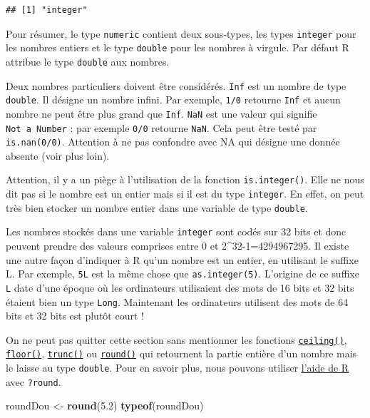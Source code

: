 \documentclass[]{book}
\newenvironment{Shaded}{\begin{snugshade}}{\end{snugshade}}
\newcommand{\FloatTok}[1]{\textcolor[rgb]{0.00,0.00,0.81}{#1}}
\newcommand{\KeywordTok}[1]{\textcolor[rgb]{0.13,0.29,0.53}{\textbf{#1}}}
\newcommand{\NormalTok}[1]{#1}
\newcommand{\StringTok}[1]{\textcolor[rgb]{0.31,0.60,0.02}{#1}}
\begin{document}
\begin{verbatim}
## [1] "integer"
\end{verbatim}

Pour résumer, le type \texttt{numeric} contient deux sous-types, les types \texttt{integer} pour les nombres entiers et le type \texttt{double} pour les nombres à virgule. Par défaut R attribue le type \texttt{double} aux nombres.

Deux nombres particuliers doivent être considérés. \texttt{Inf} est un nombre de type \texttt{double}. Il désigne un nombre infini. Par exemple, \texttt{1/0} retourne \texttt{Inf} et aucun nombre ne peut être plus grand que \texttt{Inf}. \texttt{NaN} est une valeur qui signifie \texttt{Not\ a\ Number} : par exemple \texttt{0/0} retourne \texttt{NaN}. Cela peut être testé par \texttt{is.nan(0/0)}. Attention à ne pas confondre avec NA qui désigne une donnée absente (voir plus loin).

Attention, il y a un piège à l'utilisation de la fonction \texttt{is.integer()}. Elle ne nous dit pas si le nombre est un entier mais si il est du type \texttt{integer}. En effet, on peut très bien stocker un nombre entier dans une variable de type \texttt{double}.

Les nombres stockés dans une variable \texttt{integer} sont codés sur 32 bits et donc peuvent prendre des valeurs comprises entre 0 et 2\^{}32-1=4294967295. Il existe une autre façon d'indiquer à R qu'un nombre est un entier, en utilisant le suffixe L. Par exemple, \texttt{5L} est la même chose que \texttt{as.integer(5)}. L'origine de ce suffixe \texttt{L} date d'une époque où les ordinateurs utilisaient des mots de 16 bits et 32 bits étaient bien un type \texttt{Long}. Maintenant les ordinateurs utilisent des mots de 64 bits et 32 bits est plutôt court !

On ne peut pas quitter cette section sans mentionner les fonctions \protect\hyperlink{l015round}{\texttt{ceiling()}}, \protect\hyperlink{l015round}{\texttt{floor()}}, \protect\hyperlink{l015round}{\texttt{trunc()}} ou \protect\hyperlink{l015round}{\texttt{round()}} qui retournent la partie entière d'un nombre mais le laisse au type \texttt{double}. Pour en savoir plus, nous pouvons utiliser \protect\hyperlink{l015help}{l'aide de R} avec \texttt{?round}.

\begin{Shaded}
\begin{Highlighting}[]
\NormalTok{roundDou <-}\StringTok{ }\KeywordTok{round}\NormalTok{(}\FloatTok{5.2}\NormalTok{)}
\KeywordTok{typeof}\NormalTok{(roundDou)}
\end{Highlighting}
\end{Shaded}
\end{document}
